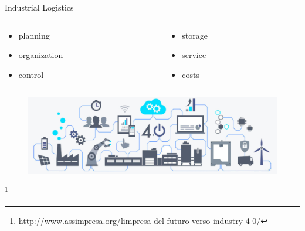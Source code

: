 
    \begin{frame}[fragile]{Industrial Logistics}
        \begin{columns}
            \begin{column}{.25\textwidth}
                \begin{itemize}
                \item  planning
                \item  organization
                \item  control
                \end{itemize} 
            \end{column}
            \begin{column}{.25\textwidth}
                \begin{itemize}
                    \item storage
                    \item service
                    \item costs
                \end{itemize}
            \end{column}
        \end{columns}
        \addvspace{0.4cm}
        \begin{figure}[hbt]
            \centering
            \includegraphics[width=\textwidth]{img/ind4.png}
        \end{figure}
        {\let\thefootnote\relax\footnote{{http://www.assimpresa.org/limpresa-del-futuro-verso-industry-4-0/}}}  
    \end{frame}

